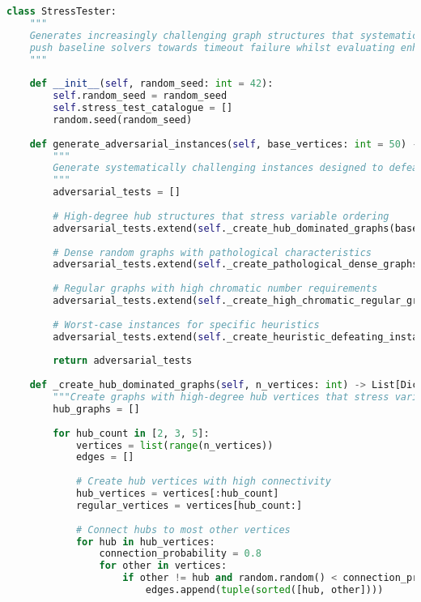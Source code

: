 \begin{lstlisting}[language=Python, caption=Adversarial Test Generation for Robustness Boundary Analysis]
class StressTester:
    """
    Generates increasingly challenging graph structures that systematically 
    push baseline solvers towards timeout failure whilst evaluating enhanced solver resilience.
    """
    
    def __init__(self, random_seed: int = 42):
        self.random_seed = random_seed
        self.stress_test_catalogue = []
        random.seed(random_seed)
    
    def generate_adversarial_instances(self, base_vertices: int = 50) -> List[Dict]:
        """
        Generate systematically challenging instances designed to defeat baseline approaches.
        """
        adversarial_tests = []
        
        # High-degree hub structures that stress variable ordering
        adversarial_tests.extend(self._create_hub_dominated_graphs(base_vertices))
        
        # Dense random graphs with pathological characteristics
        adversarial_tests.extend(self._create_pathological_dense_graphs(base_vertices))
        
        # Regular graphs with high chromatic number requirements
        adversarial_tests.extend(self._create_high_chromatic_regular_graphs(base_vertices))
        
        # Worst-case instances for specific heuristics
        adversarial_tests.extend(self._create_heuristic_defeating_instances(base_vertices))
        
        return adversarial_tests
    
    def _create_hub_dominated_graphs(self, n_vertices: int) -> List[Dict]:
        """Create graphs with high-degree hub vertices that stress variable ordering."""
        hub_graphs = []
        
        for hub_count in [2, 3, 5]:
            vertices = list(range(n_vertices))
            edges = []
            
            # Create hub vertices with high connectivity
            hub_vertices = vertices[:hub_count]
            regular_vertices = vertices[hub_count:]
            
            # Connect hubs to most other vertices
            for hub in hub_vertices:
                connection_probability = 0.8
                for other in vertices:
                    if other != hub and random.random() < connection_probability:
                        edges.append(tuple(sorted([hub, other])))
            

\end{lstlisting}
